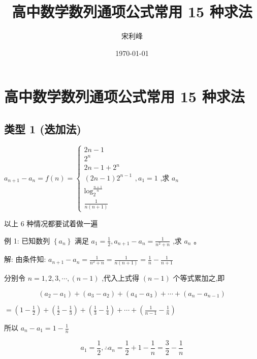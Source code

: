 \documentclass[10pt,cn]{elegantbook}
\title{高中数学数列通项公式常用 15 种求法}
\author{宋利峰}
\date{\today}
\begin{document}
	
	\maketitle
	
	\tableofcontents
	
	\mainmatter


\chapter{高中数学数列通项公式常用 15 种求法}



\section{类型 1 (迭加法)} \({a}_{n + 1} - {a}_{n} = f\left( n\right) = \left\{ \begin{array}{l} {2n} - 1 \\ {2}^{n} \\ {2n} - 1 + {2}^{n} \\ \left( {{2n} - 1}\right) {2}^{n - 1} \\ {\log }_{2}^{\frac{n + 1}{n}} \\ \frac{1}{n\left( {n + 1}\right) } \end{array}\right. ,{a}_{1} = 1\) ,求 \({a}_{n}\)

以上 6 种情况都要试着做一遍

例 1: 已知数列 \(\left\{ {a}_{n}\right\}\) 满足 \({a}_{1} = \frac{1}{2},{a}_{n + 1} - {a}_{n} = \frac{1}{{n}^{2} + n}\) ,求 \({a}_{n}\) 。

解: 由条件知: \({a}_{n + 1} - {a}_{n} = \frac{1}{{n}^{2} + n} = \frac{1}{n\left( {n + 1}\right) } = \frac{1}{n} - \frac{1}{n + 1}\)

分别令 \(n = 1,2,3,\cdots ,\left( {n - 1}\right)\) ,代入上式得 \(\left( {n - 1}\right)\) 个等式累加之,即

\[
\left( {{a}_{2} - {a}_{1}}\right) + \left( {{a}_{3} - {a}_{2}}\right) + \left( {{a}_{4} - {a}_{3}}\right) + \cdots + \left( {{a}_{n} - {a}_{n - 1}}\right)
\]

\(= \left( {1 - \frac{1}{2}}\right) + \left( {\frac{1}{2} - \frac{1}{3}}\right) + \left( {\frac{1}{3} - \frac{1}{4}}\right) + \cdots + \left( {\frac{1}{n - 1} - \frac{1}{n}}\right)\)

所以 \({a}_{n} - {a}_{1} = 1 - \frac{1}{n}\)

\[
{a}_{1} = \frac{1}{2},\therefore {a}_{n} = \frac{1}{2} + 1 - \frac{1}{n} = \frac{3}{2} - \frac{1}{n}
\]
\end{document}
